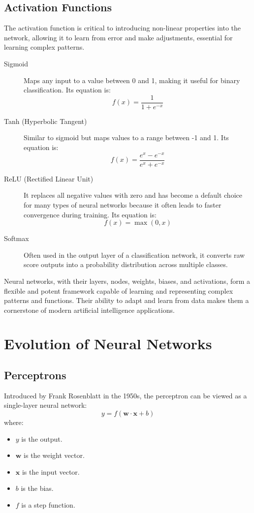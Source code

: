 \subsection{Activation Functions}
The activation function is critical to introducing non-linear properties into the network, allowing it to learn from error and make adjustments, essential for learning complex patterns.
\begin{description}
	\item[Sigmoid] Maps any input to a value between 0 and 1, making it useful for binary classification. Its equation is:
	\begin{equation}
	f(x) = \frac{1}{1 + e^{-x}}
	\end{equation}
	\item[Tanh (Hyperbolic Tangent)] Similar to sigmoid but maps values to a range between -1 and 1. Its equation is:
	\begin{equation}
	f(x) = \frac{e^{x} - e^{-x}}{e^{x} + e^{-x}}
	\end{equation}
	\item[ReLU (Rectified Linear Unit)] It replaces all negative values with zero and has become a default choice for many types of neural networks because it often leads to faster convergence during training. Its equation is:
	\begin{equation}
	f(x) = \max(0, x)
	\end{equation}
	\item[Softmax] Often used in the output layer of a classification network, it converts raw score outputs into a probability distribution across multiple classes.
\end{description}

Neural networks, with their layers, nodes, weights, biases, and activations, form a flexible and potent framework capable of learning and representing complex patterns and functions. Their ability to adapt and learn from data makes them a cornerstone of modern artificial intelligence applications.


\section{Evolution of Neural Networks}

\subsection{Perceptrons}

Introduced by Frank Rosenblatt in the 1950s, the perceptron can be viewed as a single-layer neural network:
\[ y = f(\mathbf{w} \cdot \mathbf{x} + b) \]
where:
\begin{itemize}
	\item \( y \) is the output.
	\item \( \mathbf{w} \) is the weight vector.
	\item \( \mathbf{x} \) is the input vector.
	\item \( b \) is the bias.
	\item \( f \) is a step function.
\end{itemize}

